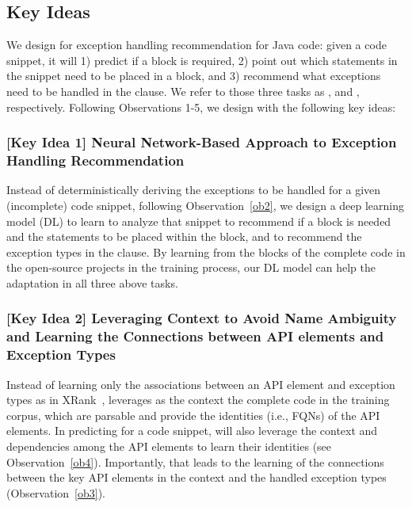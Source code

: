 \subsection{Key Ideas}
\label{key:sec}

We design {\tool} for exception handling recommendation for
Java code: given a code snippet, it will 1) predict if a
 block is required, 2) point out which statements in
the snippet need to be placed in a  block, and 3)
recommend what exceptions need to be handled in the 
clause. We refer to those three tasks as {\xblock}, {\xstate} and
{\xtype}, respectively. Following Observations 1-5, we design {\tool}
with the following key ideas:



\subsubsection{{\bf [Key Idea 1] Neural Network-Based Approach to Exception Handling Recommendation}}
Instead of deterministically deriving the exceptions to be handled for
a given (incomplete) code snippet, following Observation~\ref{ob2}, we
design a deep learning model (DL) to learn to analyze that snippet to
recommend if a  block is needed and the statements to
be placed within the  block, and to recommend the
exception types in the  clause.  By learning from the
 blocks of the complete code in the open-source
projects in the training process, our DL model can help the adaptation
in all three above tasks.




\vspace{2pt}
\subsubsection{{\bf [Key Idea 2] Leveraging Context to Avoid
Name Ambiguity and Learning the Connections between API elements and
Exception Types}} Instead of learning only the associations between an
API element and exception types as in XRank~\cite{xrank-fse20},
{\tool} leverages as the context the complete code in the training
corpus, which are parsable and provide the identities (i.e., FQNs) of
the API elements. In predicting for a code snippet, {\tool} will also
leverage the context and dependencies among the API elements to learn
their identities (see Observation~\ref{ob4}). Importantly,
that leads to the learning of the connections between the key API
elements in the context and the handled exception types
(Observation~\ref{ob3}).

